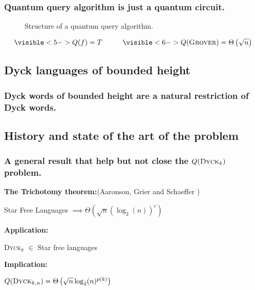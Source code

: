 \documentclass[9pt, notheorems]{beamer}
\newcommand{\Dyck}[1]{\textsc{Dyck$_{#1}$}}
\renewcommand{\comment}[1]{}
\theoremstyle{definition}
\theoremstyle{plain}
\theoremstyle{definition}
\begin{document}
\begin{frame}
    \frametitle{Quantum query algorithm is just a quantum circuit.}
    \begin{figure}
        \centering

        
        \caption{Structure of a quantum query algorithm.}
        \label{fig:quantum_query_algorithm_structure}
    \end{figure}
    {\Huge \[\visible<5->{Q(f)=T} \hspace*{1cm} \visible<6->{Q(\textsc{Grover})=\Theta\left(\sqrt{n}\right)} \]}
\end{frame}

\subsection{Dyck languages of bounded height}

\begin{frame}
    \frametitle{Dyck words of bounded height are a natural restriction of Dyck words.}
    \begin{figure}
        
    \end{figure}
    \visible<10>{
        {\Huge \[\Dyck{k}\]}}
\end{frame}

\subsection{History and state of the art of the problem}

\begin{frame}
    \frametitle{A general result that help but not close the $Q(\Dyck{k})$ problem.}
    \vfill
    \textbf{The Trichotomy theorem:}(Aaronson,
    Grier and Schaeffer \cite[2019]{trichotomy_not_andris})
    \begin{center}
        {\huge Star Free Languages $\implies \Theta\left(\sqrt{n}(\log_2(n))^c\right)$ }\\
    \end{center}
    \vfill
    \pause
    \textbf{Application:}
    \begin{center}
        {\huge \Dyck{k} $\in$ Star free languages}
    \end{center}
    \pause
    \vfill
    \textbf{Implication:}
    \begin{center}
        {\huge $\comment{\exists p, }Q(\Dyck{k,n})=\Theta \left(\sqrt{n}\log_2(n)^{p(k)}\right)$}
    \end{center}
    \vfill
\end{frame}
\end{document}
